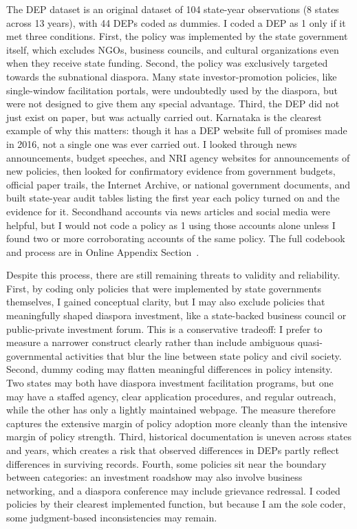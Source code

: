 \documentclass[12pt]{article}
\begin{document}
The DEP dataset is an original dataset of 104 state-year observations (8 states across 13 years), with 44 DEPs coded as dummies. I coded a DEP as 1 only if it met three conditions. First, the policy was implemented by the state government itself, which excludes NGOs, business councils, and cultural organizations even when they receive state funding. Second, the policy was exclusively targeted towards the subnational diaspora. Many state investor-promotion policies, like single-window facilitation portals, were undoubtedly used by the diaspora, but were not designed to give them any special advantage. Third, the DEP did not just exist on paper, but was actually carried out. Karnataka is the clearest example of why this matters: though it has a DEP website full of promises made in 2016, not a single one was ever carried out. I looked through news announcements, budget speeches, and NRI agency websites for announcements of new policies, then looked for confirmatory evidence from government budgets, official paper trails, the Internet Archive, or national government documents, and built state-year audit tables listing the first year each policy turned on and the evidence for it. Secondhand accounts via news articles and social media were helpful, but I would not code a policy as 1 using those accounts alone unless I found two or more corroborating accounts of the same policy. The full codebook and process are in Online Appendix Section~.

Despite this process, there are still remaining threats to validity and reliability. First, by coding only policies that were implemented by state governments themselves, I gained conceptual clarity, but I may also exclude policies that meaningfully shaped diaspora investment, like a state-backed business council or public-private investment forum. This is a conservative tradeoff: I prefer to measure a narrower construct clearly rather than include ambiguous quasi-governmental activities that blur the line between state policy and civil society. Second, dummy coding may flatten meaningful differences in policy intensity. Two states may both have diaspora investment facilitation programs, but one may have a staffed agency, clear application procedures, and regular outreach, while the other has only a lightly maintained webpage. The measure therefore captures the extensive margin of policy adoption more cleanly than the intensive margin of policy strength. Third, historical documentation is uneven across states and years, which creates a risk that observed differences in DEPs partly reflect differences in surviving records. Fourth, some policies sit near the boundary between categories: an investment roadshow may also involve business networking, and a diaspora conference may include grievance redressal. I coded policies by their clearest implemented function, but because I am the sole coder, some judgment-based inconsistencies may remain.
\end{document}
